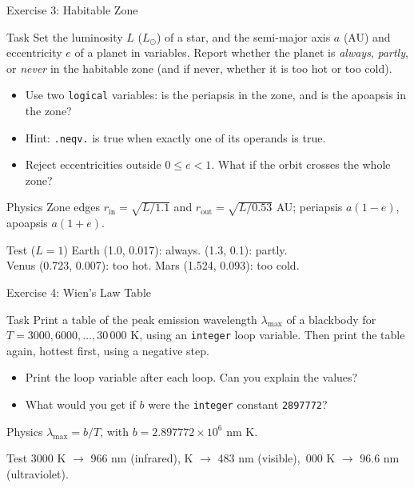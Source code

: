 \begin{frame}{Exercise 3: Habitable Zone}
  \begin{block}{Task}
  Set the luminosity $L$ ($L_\odot$) of a star, and the semi-major axis $a$ (AU) and eccentricity $e$ of a planet in variables. Report whether the planet is \emph{always}, \emph{partly}, or \emph{never} in the habitable zone (and if never, whether it is too hot or too cold).
  \begin{itemize}
    \item Use two \texttt{logical} variables: is the periapsis in the zone, and is the apoapsis in the zone?
    \item Hint: \texttt{.neqv.} is true when exactly one of its operands is true.
    \item Reject eccentricities outside $0 \leq e < 1$. What if the orbit crosses the whole zone?
  \end{itemize}
  \end{block}
  \begin{block}{Physics}
  Zone edges $r_\mathrm{in} = \sqrt{L/1.1}$ and $r_\mathrm{out} = \sqrt{L/0.53}$ AU; periapsis $a(1-e)$, apoapsis $a(1+e)$.
  \end{block}
  \begin{block}{Test ($L = 1$)}
  Earth (1.0, 0.017): always. \quad (1.3, 0.1): partly. \\ Venus (0.723, 0.007): too hot. \quad Mars (1.524, 0.093): too cold.
  \end{block}
\end{frame}

\begin{frame}{Exercise 4: Wien's Law Table}
  \begin{block}{Task}
  Print a table of the peak emission wavelength $\lambda_\mathrm{max}$ of a blackbody for $T = 3000, 6000, \ldots, 30\,000$ K, using an \texttt{integer} loop variable. Then print the table again, hottest first, using a negative step.
  \begin{itemize}
    \item Print the loop variable after each loop. Can you explain the values?
    \item What would you get if $b$ were the \texttt{integer} constant \texttt{2897772}?
  \end{itemize}
  \end{block}
  \begin{block}{Physics}
  $\lambda_\mathrm{max} = b / T$, with $b = 2.897772 \times 10^{6}$ nm K.
  \end{block}
  \begin{block}{Test}
  3000 K $\to$ 966 nm (infrared),  K $\to$ 483 nm (visible), \,000 K $\to$ 96.6 nm (ultraviolet).
  \end{block}
\end{frame}


